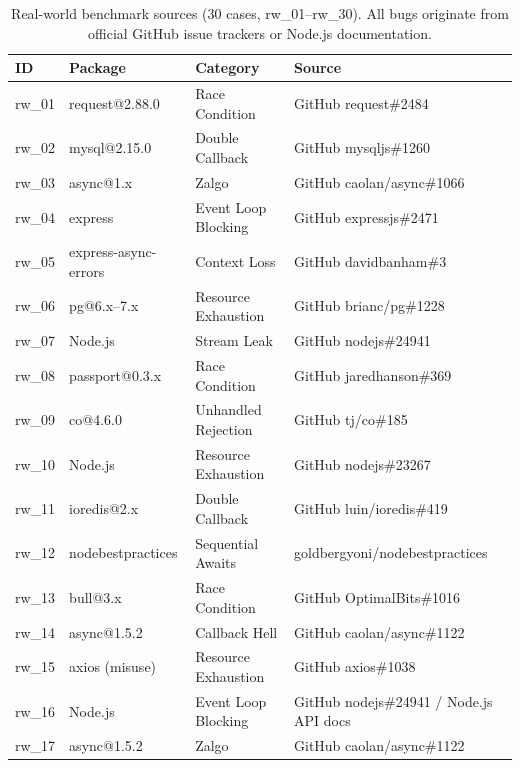 \documentclass[runningheads]{llncs}
\begin{document}
\begin{table}[H]
  \centering
  \small
  \vspace{-0.3cm}
  \caption{Real-world benchmark sources (30 cases, rw\_01--rw\_30).
           All bugs originate from official GitHub issue trackers or
           Node.js documentation.}
  \label{tab:benchmark_sources}
  \begin{tabular}{@{}lllp{3.8cm}@{}}
    \toprule
    \textbf{ID} & \textbf{Package} & \textbf{Category} & \textbf{Source} \\
    \midrule
    rw\_01 & request@2.88.0        & Race Condition      & GitHub request\#2484 \\
    rw\_02 & mysql@2.15.0          & Double Callback     & GitHub mysqljs\#1260 \\
    rw\_03 & async@1.x             & Zalgo               & GitHub caolan/async\#1066 \\
    rw\_04 & express                & Event Loop Blocking & GitHub expressjs\#2471 \\
    rw\_05 & express-async-errors  & Context Loss        & GitHub davidbanham\#3 \\
    rw\_06 & pg@6.x--7.x           & Resource Exhaustion & GitHub brianc/pg\#1228 \\
    rw\_07 & Node.js               & Stream Leak         & GitHub nodejs\#24941 \\
    rw\_08 & passport@0.3.x        & Race Condition      & GitHub jaredhanson\#369 \\
    rw\_09 & co@4.6.0              & Unhandled Rejection & GitHub tj/co\#185 \\
    rw\_10 & Node.js               & Resource Exhaustion & GitHub nodejs\#23267 \\
    rw\_11 & ioredis@2.x           & Double Callback     & GitHub luin/ioredis\#419 \\
    rw\_12 & nodebestpractices     & Sequential Awaits   & goldbergyoni/nodebestpractices \\
    rw\_13 & bull@3.x              & Race Condition      & GitHub OptimalBits\#1016 \\
    rw\_14 & async@1.5.2           & Callback Hell       & GitHub caolan/async\#1122 \\
    rw\_15 & axios (misuse)        & Resource Exhaustion & GitHub axios\#1038 \\
    rw\_16 & Node.js               & Event Loop Blocking & GitHub nodejs\#24941 / Node.js API docs \\
    rw\_17 & async@1.5.2           & Zalgo               & GitHub caolan/async\#1122 \\

\end{tabular}
\end{table}
\end{document}
